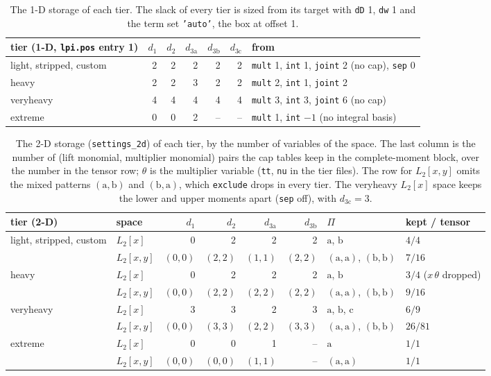 \documentclass[12pt]{article}
\newcommand{\code}[1]{\texttt{#1}}
\newcommand{\ba}{\mathrm{a}}
\newcommand{\bb}{\mathrm{b}}
\newcommand{\bc}{\mathrm{c}}
\theoremstyle{plain}
\theoremstyle{definition}
\theoremstyle{remark}
\begin{document}
\begin{table}[h]\centering\footnotesize
\setlength{\tabcolsep}{6pt}
\begin{tabular}{lrrrrrl}
\toprule
tier (1-D, \code{lpi.pos} entry 1) & $d_1$ & $d_2$ & $d_{3\ba}$ & $d_{3\bb}$ & $d_{3\bc}$ & from \\
\midrule
light, stripped, custom & 2 & 2 & 2 & 2 & 2 & \code{mult} 1, \code{int} 1, \code{joint} 2 (no cap), \code{sep} 0 \\
heavy & 2 & 2 & 3 & 2 & 2 & \code{mult} 2, \code{int} 1, \code{joint} 2 \\
veryheavy & 4 & 4 & 4 & 4 & 4 & \code{mult} 3, \code{int} 3, \code{joint} 6 (no cap) \\
extreme & 0 & 0 & 2 & -- & -- & \code{mult} 1, \code{int} $-1$ (no integral basis) \\
\bottomrule
\end{tabular}
\caption{The 1-D storage of each tier. The slack of every tier is sized from its target with \code{dD} 1, \code{dw} 1 and the term set \code{'auto'}, the box at offset 1.}\label{tab:1d}
\end{table}

\begin{table}[h]\centering\footnotesize
\setlength{\tabcolsep}{3pt}
\begin{tabular}{llrrrrll}
\toprule
tier (2-D) & space & $d_1$ & $d_2$ & $d_{3\ba}$ & $d_{3\bb}$ & $\Pi$ & kept / tensor \\
\midrule
light, stripped, custom & $L_2[x]$ & 0 & 2 & 2 & 2 & $\ba$, $\bb$ & $4/4$ \\
 & $L_2[x,y]$ & $(0,0)$ & $(2,2)$ & $(1,1)$ & $(2,2)$ & $(\ba,\ba)$, $(\bb,\bb)$ & $7/16$ \\
heavy & $L_2[x]$ & 0 & 2 & 2 & 2 & $\ba$, $\bb$ & $3/4$ ($x\,\theta$ dropped) \\
 & $L_2[x,y]$ & $(0,0)$ & $(2,2)$ & $(2,2)$ & $(2,2)$ & $(\ba,\ba)$, $(\bb,\bb)$ & $9/16$ \\
veryheavy & $L_2[x]$ & 3 & 3 & 2 & 3 & $\ba$, $\bb$, $\bc$ & $6/9$ \\
 & $L_2[x,y]$ & $(0,0)$ & $(3,3)$ & $(2,2)$ & $(3,3)$ & $(\ba,\ba)$, $(\bb,\bb)$ & $26/81$ \\
extreme & $L_2[x]$ & 0 & 0 & 1 & -- & $\ba$ & $1/1$ \\
 & $L_2[x,y]$ & $(0,0)$ & $(0,0)$ & $(1,1)$ & -- & $(\ba,\ba)$ & $1/1$ \\
\bottomrule
\end{tabular}
\caption{The 2-D storage (\code{settings\_2d}) of each tier, by the number of variables of the space. The last column is the number of (lift monomial, multiplier monomial) pairs the cap tables keep in the complete-moment block, over the number in the tensor row; $\theta$ is the multiplier variable (\code{tt}, \code{nu} in the tier files). The row for $L_2[x,y]$ omits the mixed patterns $(\ba,\bb)$ and $(\bb,\ba)$, which \code{exclude} drops in every tier. The veryheavy $L_2[x]$ space keeps the lower and upper moments apart (\code{sep} off), with $d_{3\bc}=3$.}\label{tab:2d}
\end{table}
\end{document}
